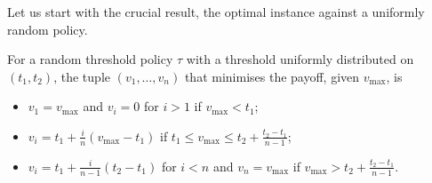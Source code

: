 \documentclass[11pt,a4paper]{article}
\numberwithin{equation}{section}
\begin{document}
Let us start with the crucial result, the optimal instance against a uniformly random policy.
\begin{lemma}
    \label{lemma:uniform-lowerbound-maximizers}
    For a random threshold policy $\tau$ with a threshold uniformly distributed on $(t_1, t_2)$, the tuple $(v_1,\dots,v_n)$ that minimises the payoff, given $v_{\max}$, is
    \begin{itemize}
        \item $v_1=v_{\max}$ and $v_i=0$ for $i>1$ if $v_{\max}<t_1$;
        \item $v_i=t_1+\frac{i}{n}(v_{\max}-t_1)$ if $t_1\le v_{\max}\le t_2+\frac{t_2-t_1}{n-1}$;
        \item $v_i=t_1+\frac{i}{n-1}(t_2-t_1)$ for $i<n$ and $v_n=v_{\max}$ if $v_{\max}> t_2+\frac{t_2-t_1}{n-1}$. 
    \end{itemize}
\end{lemma}
\end{document}
